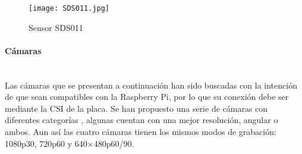 \begin{figure}[H]
	\caption{Sensor SDS011}
	\texttt{[image: SDS011.jpg]}
\end{figure}
\endminipage\hfill
{}
\begin{table}[H]
	\centering
	\caption{Especificaciones módulo SDS011}
	\label{tab:sds011}
\end{table}
\endminipage

\pagebreak
\paragraph{Cámaras}\mbox{} \\
Las cámaras que se presentan a continuación han sido buscadas con la intención de que sean compatibles con la Raspberry Pi, por lo que su conexión debe ser mediante la CSI de la placa. Se han propuesto una serie de cámaras con diferentes categorías \cite{cholewiak_raspberry_2017}, algunas cuentan con una mejor resolución, angular o ambos. Aun así las cuatro cámaras tienen los mismos modos de grabación: 1080p30, 720p60 y 640×480p60/90.

